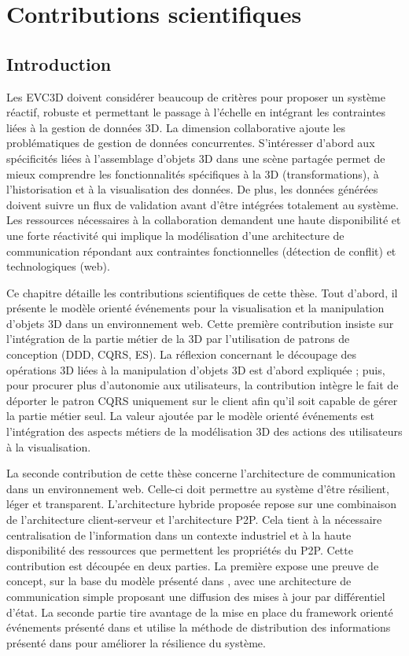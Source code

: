 \chapter{Contributions scientifiques}
\chaptertable
\section{Introduction}
Les \gls{EVC3D} doivent considérer beaucoup de critères pour 
proposer un système réactif, robuste et permettant le passage à l'échelle en 
intégrant les contraintes liées à la gestion de données \gls{3D}. La dimension 
collaborative ajoute les problématiques de gestion de données concurrentes.
S'intéresser d'abord aux spécificités liées à 
l'assemblage d'objets \gls{3D} dans une scène partagée permet de 
mieux comprendre les fonctionnalités spécifiques à la \gls{3D} (transformations), 
à l'historisation et à la visualisation des données. De plus, les données générées
doivent suivre un flux de validation avant d'être intégrées totalement au système.
Les ressources nécessaires à la collaboration demandent une haute disponibilité 
et une forte réactivité qui implique la modélisation d'une architecture 
de communication répondant aux contraintes fonctionnelles (détection de conflit) 
et technologiques (web).

Ce chapitre détaille les contributions scientifiques de cette thèse.
Tout d'abord, il présente le modèle orienté événements pour la 
visualisation et la manipulation d'objets \gls{3D} dans un environnement web. 
Cette première contribution insiste sur l'intégration de la partie métier de la 
\gls{3D} par l'utilisation de
patrons de conception (\gls{DDD}, \gls{CQRS}, \gls{ES}). La réflexion concernant 
le découpage des opérations \gls{3D} liées à la manipulation d'objets \gls{3D} est 
d'abord expliquée ; puis, pour procurer plus d'autonomie 
aux utilisateurs, la contribution intègre le fait de déporter le patron \gls{CQRS} 
uniquement sur le client afin qu'il soit capable de gérer la partie métier seul. 
La valeur ajoutée par le modèle orienté événements est l'intégration des aspects métiers de la modélisation 3D des actions des utilisateurs à la visualisation. 

La seconde contribution de cette thèse concerne l'architecture de 
communication dans un environnement web. Celle-ci doit 
permettre au système d'être résilient, léger et transparent. 
L'architecture hybride proposée repose sur une combinaison de l'architecture 
client-serveur et l'architecture \gls{P2P}. 
Cela tient à la nécessaire centralisation de l'information dans un 
contexte industriel et à la haute disponibilité des ressources que permettent les propriétés du \gls{P2P}. Cette contribution est découpée en deux parties. La première 
expose une preuve de concept, sur la base du modèle présenté 
dans \cite{Desprat2015a}, avec une architecture de communication simple 
proposant une diffusion des mises à jour par différentiel d'état. La seconde partie 
tire avantage de la mise en place du \gls{framework} orienté événements présenté 
dans 
\cite{Desprat2016} et utilise la méthode de distribution des informations présenté 
dans \cite{Desprat2017} pour améliorer la résilience du système. 

